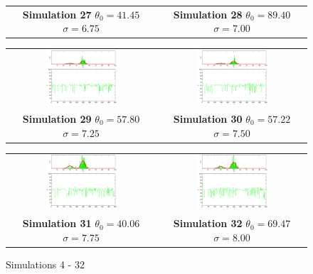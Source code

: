 \begin{figure}
\begin{tabular}{cc}
\textbf{Simulation 27} $\theta_0=   41.45$  $\sigma=    6.75$  & \textbf{Simulation 28} $\theta_0=   89.40$  $\sigma=    7.00$
\end{tabular}
\begin{tabular}{cc} 
\includegraphics[width=0.5\textwidth]{ImaginiLatex/MetropolisExample29.eps} &
\includegraphics[width=0.5\textwidth]{ImaginiLatex/MetropolisExample30.eps} \\
\textbf{Simulation 29} $\theta_0=   57.80$  $\sigma=    7.25$  & \textbf{Simulation 30} $\theta_0=   57.22$  $\sigma=    7.50$
\end{tabular}
\begin{tabular}{cc} 
\includegraphics[width=0.5\textwidth]{ImaginiLatex/MetropolisExample31.eps} &
\includegraphics[width=0.5\textwidth]{ImaginiLatex/MetropolisExample32.eps} \\
\textbf{Simulation 31} $\theta_0=   40.06$  $\sigma=    7.75$  & \textbf{Simulation 32} $\theta_0=   69.47$  $\sigma=    8.00$
\end{tabular}
\caption{Simulations 4 - 32}
\end{figure}
